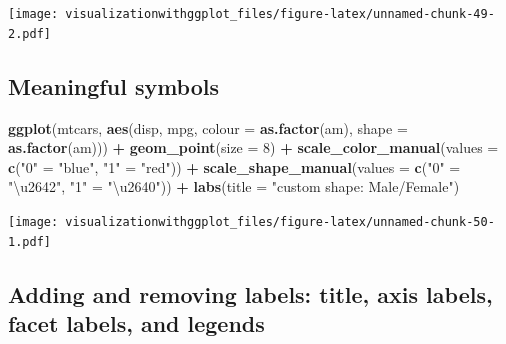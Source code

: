 \documentclass[]{krantz}
\makeatletter
\newenvironment{Shaded}{\begin{snugshade}}{\end{snugshade}}
\newcommand{\KeywordTok}[1]{\textcolor[rgb]{0.13,0.29,0.53}{\textbf{#1}}}
\newcommand{\DataTypeTok}[1]{\textcolor[rgb]{0.13,0.29,0.53}{#1}}
\newcommand{\DecValTok}[1]{\textcolor[rgb]{0.00,0.00,0.81}{#1}}
\newcommand{\StringTok}[1]{\textcolor[rgb]{0.31,0.60,0.02}{#1}}
\newcommand{\OperatorTok}[1]{\textcolor[rgb]{0.81,0.36,0.00}{\textbf{#1}}}
\newcommand{\NormalTok}[1]{#1}
\newenvironment{kframe}{%
\medskip{}
\setlength{\fboxsep}{.8em}
 \def\at@end@of@kframe{}%
 \ifinner\ifhmode%
  \def\at@end@of@kframe{\end{minipage}}%
  \begin{minipage}{\columnwidth}%
 \fi\fi%
 \def\FrameCommand##1{\hskip\@totalleftmargin \hskip-\fboxsep
 \colorbox{shadecolor}{##1}\hskip-\fboxsep
     \hskip-\linewidth \hskip-\@totalleftmargin \hskip\columnwidth}%
 \MakeFramed {\advance\hsize-\width
   \@totalleftmargin\z@ \linewidth\hsize
   \@setminipage}}%
 {\par\unskip\endMakeFramed%
 \at@end@of@kframe}
\renewenvironment{Shaded}{\begin{kframe}}{\end{kframe}}
\theoremstyle{definition}
\theoremstyle{definition}
\theoremstyle{definition}
\theoremstyle{remark}
\makeatother
\begin{document}
\texttt{[image: visualizationwithggplot\_files/figure-latex/unnamed-chunk-49-2.pdf]}

\subsection{Meaningful symbols}\label{meaningful-symbols}

\begin{Shaded}
\begin{Highlighting}[]
\KeywordTok{ggplot}\NormalTok{(mtcars, }
        \KeywordTok{aes}\NormalTok{(disp,  mpg, }\DataTypeTok{colour =} \KeywordTok{as.factor}\NormalTok{(am), }\DataTypeTok{shape =} \KeywordTok{as.factor}\NormalTok{(am))) }\OperatorTok{+}
\StringTok{  }\KeywordTok{geom_point}\NormalTok{(}\DataTypeTok{size =} \DecValTok{8}\NormalTok{) }\OperatorTok{+}\StringTok{   }
\StringTok{    }\KeywordTok{scale_color_manual}\NormalTok{(}\DataTypeTok{values =} \KeywordTok{c}\NormalTok{(}\StringTok{"0"}\NormalTok{ =}\StringTok{ "blue"}\NormalTok{, }\StringTok{"1"}\NormalTok{ =}\StringTok{ "red"}\NormalTok{)) }\OperatorTok{+}\StringTok{  }
\StringTok{  }\KeywordTok{scale_shape_manual}\NormalTok{(}\DataTypeTok{values =} \KeywordTok{c}\NormalTok{(}\StringTok{"0"}\NormalTok{ =}\StringTok{ "\textbackslash{}u2642"}\NormalTok{, }\StringTok{"1"}\NormalTok{ =}\StringTok{ "\textbackslash{}u2640"}\NormalTok{)) }\OperatorTok{+}\StringTok{  }
\StringTok{  }\KeywordTok{labs}\NormalTok{(}\DataTypeTok{title =} \StringTok{"custom shape: Male/Female"}\NormalTok{)}
\end{Highlighting}
\end{Shaded}

\texttt{[image: visualizationwithggplot\_files/figure-latex/unnamed-chunk-50-1.pdf]}

\subsection{Adding and removing labels: title, axis labels, facet
labels, and legends}\label{AddingRemovingLabels}
\end{document}
